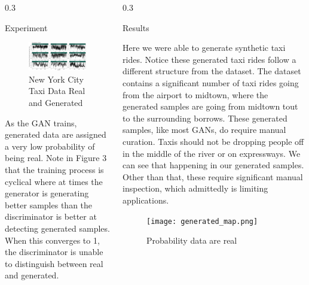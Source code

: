 \documentclass{msuposter}
\newcommand{\colwidth}{0.3\linewidth}
\begin{document}
\begin{frame}{}
\begin{columns}[t]
\begin{column}{\colwidth}
\begin{block}{Experiment}
\begin{figure}
  \includegraphics[width=\linewidth]{gan_converging.png}
  	\caption{\label{fig:my-label} New York City Taxi Data Real and Generated}
\end{figure}

As the GAN trains, generated data are assigned a very low probability of being real. Note in Figure 3 that the training process is cyclical where at times the generator is generating better samples than the discriminator is better at detecting generated samples. When this converges to 1, the discriminator is unable to distinguish between real and generated. 


\end{block}
\end{column}


\begin{column}{\colwidth}


\begin{block}{Results}

Here we were able to generate synthetic taxi rides. Notice these generated taxi rides follow a different structure from the dataset. The dataset contains a significant number of taxi rides going from the airport to midtown, where the generated samples are going from midtown tout to the surrounding borrows. These generated samples, like most GANs, do require manual curation. Taxis should not be dropping people off in the middle of the river or on expressways. We can see that happening in our generated samples. Other than that, these require significant manual inspection, which admittedly is limiting applications. 


\begin{figure}
  \texttt{[image: generated\_map.png]}
  	\caption{\label{fig:my-label} Probability data are real}
\end{figure}




\end{block}
\end{column}
\end{columns}
\end{frame}
\end{document}
